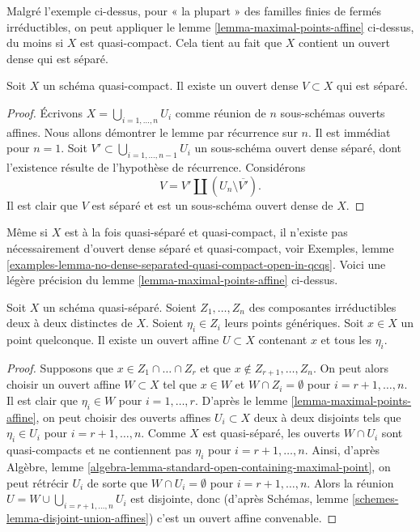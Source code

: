\noindent
Malgré l'exemple ci-dessus, pour « la plupart » des familles finies de
fermés irréductibles, on peut appliquer le lemme \ref{lemma-maximal-points-affine} ci-dessus,
du moins si $X$ est quasi-compact. Cela tient au fait que $X$ contient un
ouvert dense qui est séparé.

\begin{lemma}
\label{lemma-quasi-compact-dense-open-separated}
Soit $X$ un schéma quasi-compact.
Il existe un ouvert dense $V \subset X$ qui est séparé.
\end{lemma}

\begin{proof}
Écrivons $X = \bigcup_{i = 1, \ldots, n} U_i$ comme réunion de $n$ sous-schémas
ouverts affines. Nous allons démontrer le lemme par récurrence sur $n$. Il est immédiat pour
$n = 1$. Soit $V' \subset \bigcup_{i = 1, \ldots, n - 1} U_i$ un sous-schéma ouvert
dense séparé, dont l'existence résulte de l'hypothèse de récurrence. Considérons
$$
V = V' \amalg (U_n \setminus \overline{V'}).
$$
Il est clair que $V$ est séparé et est un sous-schéma ouvert dense de $X$.
\end{proof}

\noindent
Même si $X$ est à la fois quasi-séparé et quasi-compact,
il n'existe pas nécessairement d'ouvert dense séparé et quasi-compact, voir
Exemples, lemme
\ref{examples-lemma-no-dense-separated-quasi-compact-open-in-qcqs}.
Voici une légère précision du lemme \ref{lemma-maximal-points-affine} ci-dessus.

\begin{lemma}
\label{lemma-point-and-maximal-points-affine}
Soit $X$ un schéma quasi-séparé. Soient $Z_1, \ldots, Z_n$ des composantes
irréductibles deux à deux distinctes de $X$. Soient $\eta_i \in Z_i$ leurs
points génériques. Soit $x \in X$ un point quelconque.
Il existe un ouvert affine $U \subset X$ contenant
$x$ et tous les $\eta_i$.
\end{lemma}

\begin{proof}
Supposons que $x \in Z_1 \cap \ldots \cap Z_r$ et que
$x \not \in Z_{r + 1}, \ldots, Z_n$. On peut alors choisir
un ouvert affine $W \subset X$ tel que
$x \in W$ et $W \cap Z_i = \emptyset$ pour
$i = r + 1, \ldots, n$. Il est clair que $\eta_i \in W$
pour $i = 1, \ldots, r$. D'après le lemme \ref{lemma-maximal-points-affine},
on peut choisir des ouverts affines $U_i \subset X$ deux à deux
disjoints tels que $\eta_i \in U_i$ pour $i = r + 1, \ldots, n$.
Comme $X$ est quasi-séparé, les ouverts $W \cap U_i$
sont quasi-compacts et ne contiennent pas $\eta_i$ pour
$i = r + 1, \ldots, n$. Ainsi, d'après
Algèbre, lemme \ref{algebra-lemma-standard-open-containing-maximal-point},
on peut rétrécir $U_i$ de sorte que $W \cap U_i = \emptyset$
pour $i = r + 1, \ldots, n$. Alors la réunion
$U = W \cup \bigcup_{i = r + 1, \ldots, n} U_i$ est disjointe, donc
(d'après Schémas, lemme \ref{schemes-lemma-disjoint-union-affines})
c'est un ouvert affine convenable.
\end{proof}

